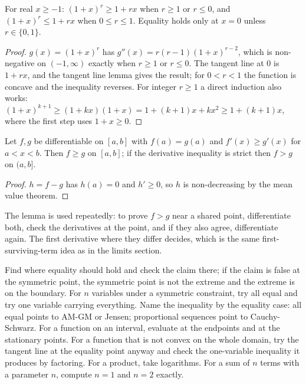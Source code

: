 \begin{theorem}[Bernoulli]
For real $x\ge -1$: $(1+x)^r\ge 1+rx$ when $r\ge 1$ or $r\le 0$, and $(1+x)^r\le 1+rx$ when $0\le r\le 1$. Equality holds only at $x=0$ unless $r\in\{0,1\}$.
\end{theorem}

\begin{proof}
$g(x)=(1+x)^r$ has $g''(x)=r(r-1)(1+x)^{r-2}$, which is non-negative on $(-1,\infty)$ exactly when $r\ge 1$ or $r\le 0$. The tangent line at $0$ is $1+rx$, and the tangent line lemma gives the result; for $0<r<1$ the function is concave and the inequality reverses. For integer $r\ge 1$ a direct induction also works: $(1+x)^{k+1}\ge(1+kx)(1+x)=1+(k+1)x+kx^2\ge 1+(k+1)x$, where the first step uses $1+x\ge 0$.
\end{proof}

\begin{lemma}
Let $f,g$ be differentiable on $[a,b]$ with $f(a)=g(a)$ and $f'(x)\ge g'(x)$ for $a<x<b$. Then $f\ge g$ on $[a,b]$; if the derivative inequality is strict then $f>g$ on $(a,b]$.
\end{lemma}

\begin{proof}
$h=f-g$ has $h(a)=0$ and $h'\ge 0$, so $h$ is non-decreasing by the mean value theorem.
\end{proof}

The lemma is used repeatedly: to prove $f>g$ near a shared point, differentiate both, check the derivatives at the point, and if they also agree, differentiate again. The first derivative where they differ decides, which is the same first-surviving-term idea as in the limits section.

\begin{firstmoves}
Find where equality should hold and check the claim there; if the claim is false at the symmetric point, the symmetric point is not the extreme and the extreme is on the boundary. For $n$ variables under a symmetric constraint, try all equal and try one variable carrying everything. Name the inequality by the equality case: all equal points to AM-GM or Jensen; proportional sequences point to Cauchy-Schwarz. For a function on an interval, evaluate at the endpoints and at the stationary points. For a function that is not convex on the whole domain, try the tangent line at the equality point anyway and check the one-variable inequality it produces by factoring. For a product, take logarithms. For a sum of $n$ terms with a parameter $n$, compute $n=1$ and $n=2$ exactly.
\end{firstmoves}

